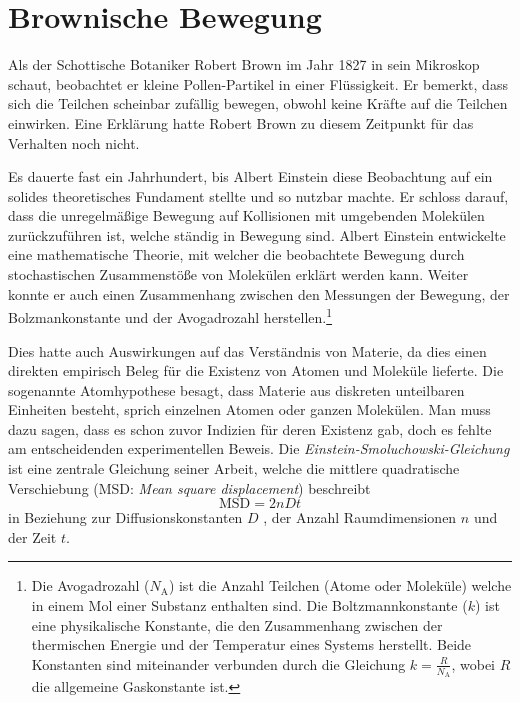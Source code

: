 %
%
%
%

\section{Brownische Bewegung\label{brown:BrownBewegung}}

Als der Schottische Botaniker Robert Brown im Jahr 1827 in sein Mikroskop schaut, beobachtet er kleine Pollen-Partikel in einer Flüssigkeit. Er bemerkt, dass sich die Teilchen scheinbar zufällig bewegen, obwohl keine Kräfte auf die Teilchen einwirken. Eine Erklärung hatte Robert Brown zu diesem Zeitpunkt für das Verhalten noch nicht.


Es dauerte fast ein Jahrhundert, bis Albert Einstein diese Beobachtung auf ein solides theoretisches Fundament stellte und so nutzbar machte. Er schloss darauf, dass die unregelmäßige Bewegung auf Kollisionen mit umgebenden Molekülen zurückzuführen ist, welche ständig in Bewegung sind. Albert Einstein entwickelte eine mathematische Theorie, mit welcher die beobachtete Bewegung durch stochastischen Zusammenstöße von Molekülen erklärt werden kann. Weiter konnte er auch einen Zusammenhang zwischen den Messungen der Bewegung, der Bolzmankonstante und der  Avogadrozahl herstellen.\footnote{Die Avogadrozahl ($N_\mathrm{A}$) ist die Anzahl Teilchen (Atome oder Moleküle) welche in einem Mol einer Substanz enthalten sind. Die Boltzmannkonstante ($k$) ist eine physikalische Konstante, die den Zusammenhang zwischen der thermischen Energie und der Temperatur eines Systems herstellt. Beide Konstanten sind miteinander verbunden durch die Gleichung $k = \frac{R}{N_\mathrm{A}}$, wobei $R$ die allgemeine Gaskonstante ist.}


Dies hatte auch Auswirkungen auf das Verständnis von Materie, da dies einen direkten empirisch Beleg für die Existenz von Atomen und Moleküle lieferte. Die sogenannte Atomhypothese besagt, dass Materie aus diskreten unteilbaren Einheiten besteht, sprich einzelnen Atomen oder ganzen Molekülen. 
Man muss dazu sagen, dass es schon zuvor Indizien für deren Existenz gab, doch es fehlte am entscheidenden experimentellen Beweis.
Die \textit{Einstein-Smoluchowski-Gleichung} ist eine zentrale Gleichung seiner Arbeit, welche die mittlere quadratische Verschiebung (MSD: \textit{Mean square displacement}) beschreibt
\begin{equation}
	\mathrm{MSD} = 2nDt
\end{equation}
in Beziehung zur Diffusionskonstanten $ D $ , der Anzahl Raumdimensionen $ n $ und der Zeit $ t $.

